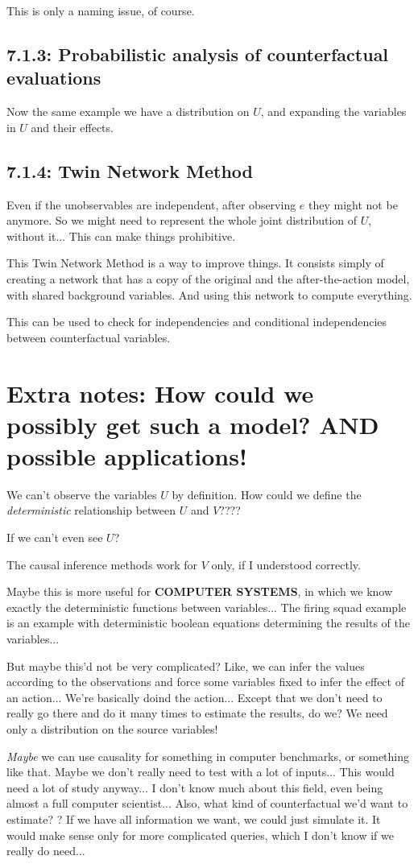 This is only a naming issue, of course.

\subsection{7.1.3: Probabilistic analysis of counterfactual evaluations}

Now the same example we have a distribution on $U$, and expanding the variables in $U$ and their effects.

\subsection{7.1.4: Twin Network Method}

Even if the unobservables are independent, after observing $e$ they might not be anymore. So we might need to represent the whole joint distribution of $U$, without  it... This can make things prohibitive.

This Twin Network Method is a way to improve things. It consists simply of creating a network that has a copy of the original and the after-the-action model, with shared background variables. And using this network to compute everything.

This can be used to check for independencies and conditional independencies between counterfactual variables.

\section{Extra notes: How could we \textbf{possibly} get such a model? AND possible applications!}

We can't observe the variables $U$ by definition. How could we define the \textit{deterministic} relationship between $U$ and $V$????

If we can't even see $U$?

The causal inference methods work for $V$ only, if I understood correctly.

Maybe this is more useful for \textbf{COMPUTER SYSTEMS}, in which we know exactly the deterministic functions between variables... The firing squad example is an example with deterministic boolean equations determining the results of the variables...

But maybe this'd not be very complicated? Like, we can infer the values according to the observations and force some variables fixed to infer the effect of an action... We're basically doind the action... Except that we don't need to really go there and do it many times to estimate the results, do we? We need only a distribution on the source variables!

\textit{Maybe} we can use causality for something in computer benchmarks, or something like that. Maybe we don't really need to test with a lot of inputs... This would need a lot of study anyway... I don't know much about this field, even being almost a full computer scientist... Also, what kind of counterfactual we'd want to estimate? ? If we have all information we want, we could just simulate it. It would make sense only for more complicated queries, which I don't know if we really do need...
